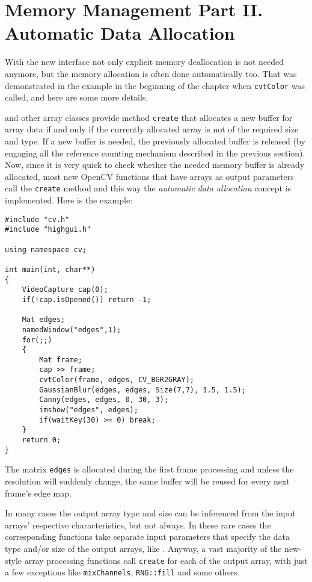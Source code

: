 \section{Memory Management Part II. Automatic Data Allocation}\label{AutomaticMemoryManagement2}

With the new interface not only explicit memory deallocation is not needed anymore,
but the memory allocation is often done automatically too. That was demonstrated in the example
in the beginning of the chapter when \texttt{cvtColor} was called, and here are some more details.

 and other array classes provide method \texttt{create} that allocates a new buffer for array
data if and only if the currently allocated array is not of the required size and type.
If a new buffer is needed, the previously allocated buffer is released
(by engaging all the reference counting mechanism described in the previous section).
Now, since it is very quick to check whether the needed memory buffer is already allocated,
most new OpenCV functions that have arrays as output parameters call the \texttt{create} method and
this way the \emph{automatic data allocation} concept is implemented. Here is the example:
\begin{lstlisting}
#include "cv.h"
#include "highgui.h"

using namespace cv;

int main(int, char**)
{
    VideoCapture cap(0);
    if(!cap.isOpened()) return -1;

    Mat edges;
    namedWindow("edges",1);
    for(;;)
    {
        Mat frame;
        cap >> frame;
        cvtColor(frame, edges, CV_BGR2GRAY);
        GaussianBlur(edges, edges, Size(7,7), 1.5, 1.5);
        Canny(edges, edges, 0, 30, 3);
        imshow("edges", edges);
        if(waitKey(30) >= 0) break;
    }
    return 0;
}
\end{lstlisting}
The matrix \texttt{edges} is allocated during the first frame processing and unless the resolution will suddenly change,
the same buffer will be reused for every next frame's edge map.

In many cases the output array type and size can be inferenced from the input arrays' respective characteristics, but not always.
In these rare cases the corresponding functions take separate input parameters that specify the data type and/or size of the output arrays,
like . Anyway, a vast majority of the new-style array processing functions call \texttt{create}
for each of the output array, with just a few exceptions like \texttt{mixChannels}, \texttt{RNG::fill} and some others.

